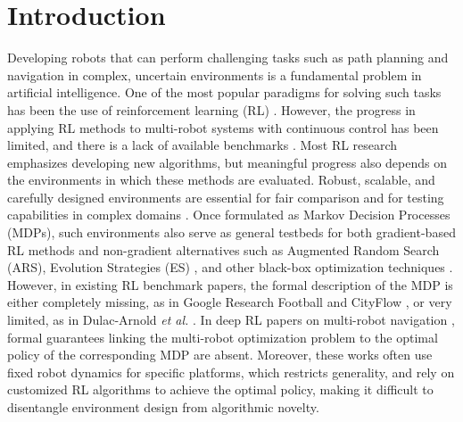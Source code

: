 \documentclass[letterpaper, 10 pt, conference]{ieeeconf}  %
\begin{document}
\section{Introduction}
\label{sec:intro}
Developing robots that can perform challenging tasks such as path planning and navigation in complex, uncertain environments is a fundamental problem in artificial intelligence. One of the most popular paradigms for solving such tasks has been the use of reinforcement learning (RL) \cite{chen2017icra, everett2018iros, long2017iral, fan2020ijrr, han2022iral}. However, the progress in applying RL methods to multi-robot systems with continuous control has been limited, and there is a lack of available benchmarks \cite{brockman2016openai, islam2017reproducibility, mania2018ars, dulacArnold2021}. Most RL research emphasizes developing new algorithms, but meaningful progress also depends on the environments in which these methods are evaluated. Robust, scalable, and carefully designed environments are essential for fair comparison and for testing capabilities in complex domains \cite{dulacArnold2021, sutton2018reinforcement}. Once formulated as Markov Decision Processes (MDPs), such environments also serve as general testbeds for both gradient-based RL methods and non-gradient alternatives such as Augmented Random Search (ARS)\cite{mania2018ars}, Evolution Strategies (ES) \cite{salimans2017}, and other black-box optimization techniques \cite{risi2015neuroevolution}. However, in existing RL benchmark papers, the formal description of the MDP is either completely missing, as in Google Research Football \cite{kurach2020google} and CityFlow \cite{zhang2019cityflow}, or very limited, as in Dulac-Arnold \textit{et al.} \cite{dulacArnold2021}. In deep RL papers on multi-robot navigation \cite{chen2017icra, everett2018iros, long2017iral, fan2020ijrr, han2022iral}, formal guarantees linking the multi-robot optimization problem to the optimal policy of the corresponding MDP are absent. Moreover, these works often use fixed robot dynamics for specific platforms, which restricts generality, and rely on customized RL algorithms to achieve the optimal policy, making it difficult to disentangle environment design from algorithmic novelty.
\end{document}
